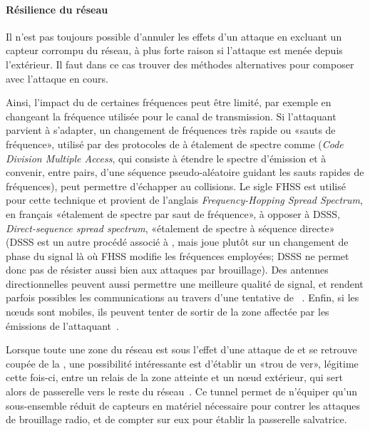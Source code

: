 \paragraph{Résilience du réseau}
Il n'est pas toujours possible d'annuler les effets d'un attaque en excluant un capteur corrompu du réseau, à plus forte raison si l'attaque est menée depuis l'extérieur.
Il faut dans ce cas trouver des méthodes alternatives pour composer avec l'attaque en cours.

Ainsi, l'impact du  de certaines fréquences peut être limité, par exemple en changeant la fréquence utilisée pour le canal de transmission.
Si l'attaquant parvient à s'adapter, un changement de fréquences très rapide ou «sauts de fréquence», utilisé par des protocoles de  à étalement de spectre comme \cdma (\textit{Code Division Multiple Access}, qui consiste à étendre le spectre d'émission et à convenir, entre pairs, d'une séquence pseudo-aléatoire guidant les sauts rapides de fréquences), peut permettre d'échapper au collisions.
Le sigle FHSS est utilisé pour cette technique et provient de l'anglais \textit{Frequency-Hopping Spread Spectrum}, en français «étalement de spectre par saut de fréquence», à opposer à DSSS, \textit{Direct-sequence spread spectrum}, \cad «étalement de spectre à séquence directe» (DSSS est un autre procédé associé à \cdma, mais joue plutôt sur un changement de phase du signal là où FHSS modifie les fréquences employées; DSSS ne permet donc pas de résister aussi bien aux attaques par brouillage).
Des antennes directionnelles peuvent aussi permettre une meilleure qualité de signal, et rendent parfois possibles les communications au travers d'une tentative de ~\cite{PI11}.
Enfin, si les nœuds sont mobiles, ils peuvent tenter de sortir de la zone affectée par les émissions de l'attaquant~\cite{PI11}.

Lorsque toute une zone du réseau est sous l'effet d'une attaque de  et se retrouve coupée de la \sdb, une possibilité intéressante est d'établir un «trou de ver», légitime cette fois-ci, entre un relais de la zone atteinte et un nœud extérieur, qui sert alors de passerelle vers le reste du réseau~\cite{CCH07}.
Ce tunnel permet de n'équiper qu'un sous-ensemble réduit de capteurs en matériel nécessaire pour contrer les attaques de brouillage radio, et de compter sur eux pour établir la passerelle salvatrice.

